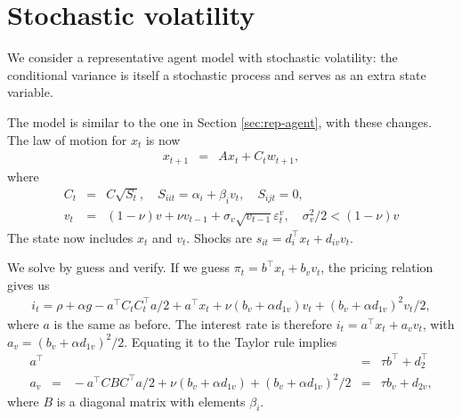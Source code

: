 \documentclass[11pt]{article}
\begin{document}
{%

\begin{comment}
{\it Kalman filter.\/}
The idea is to estimate the state $x_t$ given
(infinite) measurement histories $ y^s = (y_s, y_{s-1}, \ldots)$.
One popular notation is to express conditional expectations of
$x_t$ by
\begin{eqnarray*}
    \widehat{x}_{t|s} &=& E (x_t | y^s) .
\end{eqnarray*}
We use a more compact notation that's also common,
\begin{eqnarray*}
    \widehat{x}_{t}   &=& E (x_t | y^{t}) \\
    \widehat{x}_{t}^{-} &=& E ( x_t | y^{t-1} ) .
\end{eqnarray*}

Etc.
\end{comment}


\section{Stochastic volatility}
\label{app:stoch-vol}

We consider a representative agent model
with stochastic volatility:
the conditional variance is itself a stochastic process
and serves as an extra state variable.

The model is similar to the one in Section \ref{sec:rep-agent},
with these changes.
The law of motion for $x_t$ is now
\begin{eqnarray*}
    x_{t+1} &=&  A  x_t + C_t w_{t+1} ,
\end{eqnarray*}
where
\begin{eqnarray*}
   C_t &=& C \sqrt{S_t}, \quad S_{ii t} = \alpha_i+\beta_i v_t, \quad S_{ijt}=0, \\
       v_t &=& (1-\nu) v + \nu v_{t-1} + \sigma_v \sqrt{v_{t-1}} \varepsilon_t^v, \quad \sigma_v^2/2<(1-\nu)v
\end{eqnarray*}
The state now includes $x_t$ and $v_t$.
Shocks are $s_{it}=d_i^{\top}x_t+d_{iv}v_t.$

We solve by guess and verify.
If we guess $\pi_t=b^{\top}x_t + b_v v_t$,
the pricing relation gives us
\begin{eqnarray*}
    i_t = \rho + \alpha g - a^{\top} C_t C_t^{\top} a/2 + a^{\top} x_t + \nu (b_v+\alpha d_{1v}) v_t + (b_v+\alpha d_{1v})^2 v_t/2,
\end{eqnarray*}
where $a$ is the same as before.
The interest rate is therefore $i_t=a^{\top}x_t+a_v v_t$,
with $a_v = (b_v + \alpha d_{1v})^2/2 $.
Equating it to the Taylor rule implies
\begin{eqnarray*}
     a^{\top} &=& \tau b^{\top} +d_2^{\top} \\
     a_v \;\;=\;\; - a^{\top} C B C^{\top} a/2 + \nu (b_v+\alpha d_{1v}) + (b_v+\alpha d_{1v})^2 /2 &=& \tau b_v + d_{2v},
\end{eqnarray*}
where $ B$ is a diagonal matrix with elements $\beta_i$.

}
\end{document}
